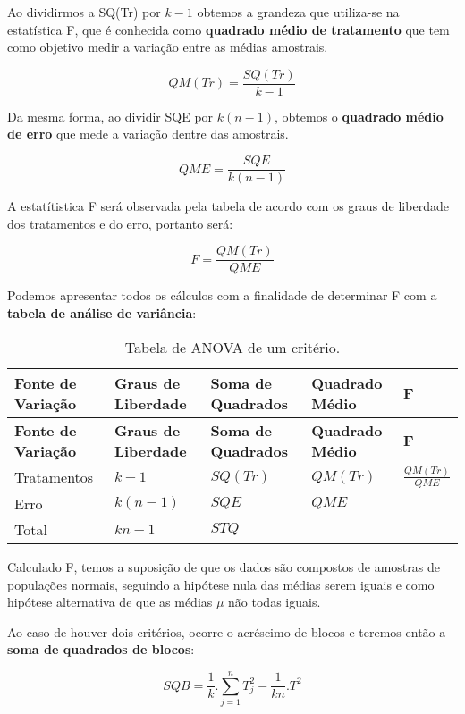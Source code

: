 \documentclass[
  openany]{book}
\begin{document}
Ao dividirmos a SQ(Tr) por \(k-1\) obtemos a grandeza que utiliza-se na estatística F, que é conhecida como \textbf{quadrado médio de tratamento} que tem como objetivo medir a variação entre as médias amostrais.

\begin{equation} 
QM(Tr)=\frac{SQ(Tr)}{k-1}
  \label{eq:qmtr1}
\end{equation}

Da mesma forma, ao dividir SQE por \(k(n-1)\), obtemos o \textbf{quadrado médio de erro} que mede a variação dentre das amostrais.

\begin{equation} 
QME=\frac{SQE}{k(n-1)}
  \label{eq:qme1}
\end{equation}

A estatítistica F será observada pela tabela de acordo com os graus de liberdade dos tratamentos e do erro, portanto será:

\begin{equation} 
F=\frac{QM(Tr)}{QME}
  \label{eq:fanova}
\end{equation}

Podemos apresentar todos os cálculos com a finalidade de determinar F com a \textbf{tabela de análise de variância}:

\begin{longtable}[]{@{}lllll@{}}
\caption{\label{tab:anova1} Tabela de ANOVA de um critério.}\tabularnewline
\toprule
\textbf{Fonte de Variação} & \textbf{Graus de Liberdade} & \textbf{Soma de Quadrados} & \textbf{Quadrado Médio} & \textbf{F}\tabularnewline
\midrule
\endfirsthead
\toprule
\textbf{Fonte de Variação} & \textbf{Graus de Liberdade} & \textbf{Soma de Quadrados} & \textbf{Quadrado Médio} & \textbf{F}\tabularnewline
\midrule
\endhead
Tratamentos & \(k-1\) & \(SQ(Tr)\) & \(QM(Tr)\) & \(\frac{QM(Tr)}{QME}\)\tabularnewline
Erro & \(k(n-1)\) & \(SQE\) & \(QME\) &\tabularnewline
Total & \(kn-1\) & \(STQ\) & &\tabularnewline
\bottomrule
\end{longtable}

Calculado F, temos a suposição de que os dados são compostos de amostras de populações normais, seguindo a hipótese nula das médias serem iguais e como hipótese alternativa de que as médias \(\mu\) não todas iguais.

Ao caso de houver dois critérios, ocorre o acréscimo de blocos e teremos então a \textbf{soma de quadrados de blocos}:

\begin{equation} 
SQB=\frac{1}{k}. \displaystyle \sum^n_{j=1} T^2_j-\frac{1}{kn}.T^2
  \label{eq:sqblocoss}
\end{equation}
\end{document}
